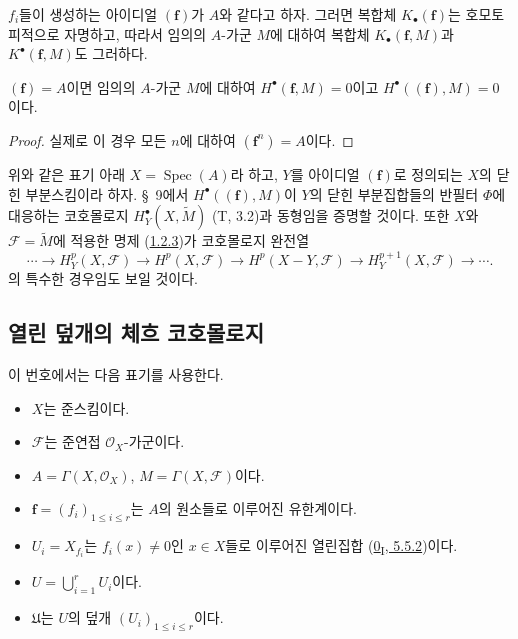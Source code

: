 \begin{proposition}[1.1.8]
\label{III.1.1.8-fr}
$f_i$들이 생성하는 아이디얼 $(\mathbf f)$가 $A$와 같다고 하자. 그러면
복합체 $K_\bullet(\mathbf f)$는 호모토피적으로 자명하고, 따라서 임의의
$A$-가군 $M$에 대하여 복합체 $K_\bullet(\mathbf f,M)$과
$K^\bullet(\mathbf f,M)$도 그러하다.
\end{proposition}

\begin{corollary}[1.1.9]
\label{III.1.1.9-fr}
$(\mathbf f)=A$이면 임의의 $A$-가군 $M$에 대하여
$H^\bullet(\mathbf f,M)=0$이고 $H^\bullet((\mathbf f),M)=0$이다.
\end{corollary}

\begin{proof}
실제로 이 경우 모든 $n$에 대하여 $(\mathbf f^n)=A$이다.
\end{proof}

\begin{remark}[1.1.10]
\label{III.1.1.10-fr}
위와 같은 표기 아래 $X=\operatorname{Spec}(A)$라 하고, $Y$를 아이디얼
$(\mathbf f)$로 정의되는 $X$의 닫힌 부분스킴이라 하자. \S~9에서
$H^\bullet((\mathbf f),M)$이 $Y$의 닫힌 부분집합들의 반필터 $\Phi$에
대응하는 코호몰로지 $H_Y^\bullet(X,\widetilde M)$ (T, 3.2)과 동형임을
증명할 것이다. 또한 $X$와 $\mathcal F=\widetilde M$에 적용한 명제
(\hyperref[III.1.2.3-fr]{1.2.3})가 코호몰로지 완전열
\[
\cdots\longrightarrow H_Y^p(X,\mathcal F)\longrightarrow H^p(X,\mathcal F)
\longrightarrow H^p(X-Y,\mathcal F)\longrightarrow H_Y^{p+1}(X,\mathcal F)
\longrightarrow\cdots.
\]
의 특수한 경우임도 보일 것이다.
\end{remark}

\subsection{열린 덮개의 체흐 코호몰로지}
\label{subsection:III.1.2-fr}

\begin{notation}[1.2.1]
\label{III.1.2.1-fr}
이 번호에서는 다음 표기를 사용한다.
\begin{itemize}
\item $X$는 준스킴이다.
\item $\mathcal F$는 준연접 $\mathcal O_X$-가군이다.
\item $A=\Gamma(X,\mathcal O_X)$, $M=\Gamma(X,\mathcal F)$이다.
\item $\mathbf f=(f_i)_{1\leq i\leq r}$는 $A$의 원소들로 이루어진 유한계이다.
\item $U_i=X_{f_i}$는 $f_i(x)\neq0$인 $x\in X$들로 이루어진 열린집합
(\hyperref[0.5.5.2-ko]{0\textsubscript{I}, 5.5.2})이다.
\item $U=\bigcup_{i=1}^r U_i$이다.
\item $\mathfrak U$는 $U$의 덮개 $(U_i)_{1\leq i\leq r}$이다.
\end{itemize}
\end{notation}

